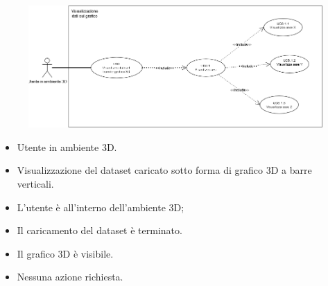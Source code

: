 \begin{figure}[h!]
    \centering
    \includegraphics[scale=0.45]{template/images/UC6.png}
    \caption{}
\end{figure}
\UCdsc
    { %
        \begin{itemize}
            \item Utente in ambiente 3D.
        \end{itemize}
    }
    { %
        \begin{itemize}
            \item Visualizzazione del dataset caricato sotto forma di grafico 3D a barre verticali.
        \end{itemize}
    }
    { %
        \begin{itemize}
            \item L'utente è all'interno dell'ambiente 3D;
            \item Il caricamento del dataset è terminato.
        \end{itemize}
    }
    { %
        \begin{itemize}
            \item Il grafico 3D è visibile.
        \end{itemize}
    }
    { %
        \begin{itemize}
            \item Nessuna azione richiesta.
        \end{itemize}
    }



